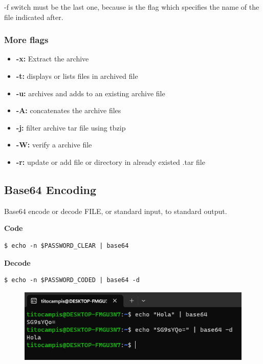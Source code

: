 \documentclass{article}
\newenvironment{blocktemplateIII}[1]{%
    \tcolorbox[beamer,%
    noparskip,breakable,
    ,colframe=Red,%
    colbacklower=LimeGreen!75!LightGreen,%
    title=#1]}%
    {\endtcolorbox}
\newenvironment{codetemplate}[1][]{%
  \mybasecolorbox[#1]
  \itshape
}{%
  \endmybasecolorbox
}
\begin{document}
\begin{blocktemplateIII}{Nota}
-f switch must be the last one, because is the flag which specifies the name of the file indicated after.
\end{blocktemplateIII}

\subsubsection{More flags}
\begin{itemize}
    \item \textbf{-x:} Extract the archive 
    \item \textbf{-t:} displays or lists files in archived file 
    \item \textbf{-u:} archives and adds to an existing archive file 
    \item \textbf{-A:} concatenates the archive files 
    \item \textbf{-j:} filter archive tar file using tbzip
    \item \textbf{-W:} verify a archive file
    \item \textbf{-r:} update or add file or directory in already existed .tar file
\end{itemize}

\subsection{Base64 Encoding}

Base64 encode or decode FILE, or standard input, to standard output.

\textbf{Code}
\begin{codetemplate}{}
\begin{verbatim}
$ echo -n $PASSWORD_CLEAR | base64
\end{verbatim}
\end{codetemplate}

\textbf{Decode}
\begin{codetemplate}{}
\begin{verbatim}
$ echo -n $PASSWORD_CODED | base64 -d
\end{verbatim}
\end{codetemplate}

\begin{figure}[H]
    \centering
    \includegraphics[width=\textwidth]{pictures/base64.png}
\end{figure}
\end{document}

